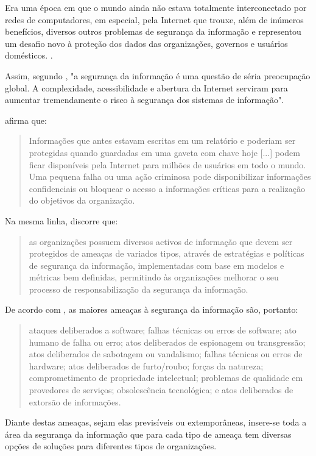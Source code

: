 Era uma época em que o mundo ainda não estava totalmente interconectado por redes de computadores, em especial, pela Internet que trouxe, além de inúmeros benefícios, diversos outros problemas de segurança da informação e representou um desafio novo à proteção dos dados das organizações, governos e usuários domésticos. \cite{fontes_politicas}. 

Assim, segundo \cite{mukkamala_intrusion_2002}, "a segurança da informação é uma questão de séria preocupação global. A complexidade, acessibilidade e abertura da Internet serviram para aumentar tremendamente o risco à segurança dos sistemas de informação".

\cite[p. 2]{fontes_politicas} afirma que:
\begin{quote}
	Informações que antes estavam escritas em um relatório e poderiam ser protegidas quando guardadas em uma gaveta com chave hoje [...] podem ficar disponíveis pela Internet para milhões de usuários em todo o mundo. Uma pequena falha ou uma ação criminosa pode disponibilizar informações confidenciais ou bloquear o acesso a informações críticas para a realização do objetivos da organização.
\end{quote}

Na mesma linha, \cite{casaca_porque_2013} discorre que:

\begin{quote}
	as organizações possuem diversos activos de informação que devem ser 
protegidos de ameaças de variados tipos, através de estratégias e políticas de 
segurança  da  informação,  implementadas  com  base  em  modelos  e  métricas 
bem  definidas,  permitindo  às  organizações  melhorar  o  seu  processo  de 
responsabilização da segurança da informação.
\end{quote}

De acordo com \cite{benz_universidade_nodate}, as maiores ameaças à segurança da informação são, portanto:
\begin{quote}
	ataques deliberados a software; falhas técnicas ou erros de software; ato humano de falha ou erro; atos deliberados de espionagem ou transgressão; atos deliberados de sabotagem ou vandalismo; falhas técnicas ou erros de hardware; atos deliberados de furto/roubo; forças da natureza; comprometimento de propriedade intelectual; problemas de qualidade em provedores de serviços; obsolescência tecnológica; e atos deliberados de extorsão de informações.
\end{quote}

Diante destas ameaças, sejam elas previsíveis ou extemporâneas, insere-se toda a área da segurança da informação que para cada tipo de ameaça tem diversas opções de soluções para diferentes tipos de organizações. \cite{doherty_information_2005} 

